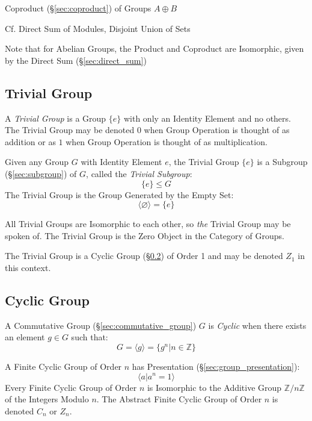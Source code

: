 Coproduct (\S\ref{sec:coproduct}) of Groups $A \oplus B$

\fist Cf. Direct Sum of Modules, Disjoint Union of Sets

\fist Note that for Abelian Groups, the Product and Coproduct
are Isomorphic, given by the Direct Sum (\S\ref{sec:direct_sum})



\subsection{Trivial Group}\label{sec:trivial_group}

A \emph{Trivial Group} is a Group $\{e\}$ with only an Identity Element and no
others. The Trivial Group may be denoted $0$ when Group Operation is thought of
as addition or as $1$ when Group Operation is thought of as multiplication.

Given any Group $G$ with Identity Element $e$, the Trivial Group $\{e\}$ is a
Subgroup (\S\ref{sec:subgroup}) of $G$, called the \emph{Trivial Subgroup}:
\[
    \{e\} \leq G
\]
The Trivial Group is the Group Generated by the Empty Set:
\[
  \langle{\varnothing}\rangle = \{ e \}
\]

All Trivial Groups are Isomorphic to each other, so \emph{the} Trivial Group may
be spoken of. The Trivial Group is the Zero Object in the Category of Groups.

The Trivial Group is a Cyclic Group (\S\ref{sec:cyclic_group}) of Order 1 and
may be denoted $Z_1$ in this context.



\subsection{Cyclic Group}\label{sec:cyclic_group}

A Commutative Group (\S\ref{sec:commutative_group}) $G$ is \emph{Cyclic} when
there exists an element $g \in G$ such that:
\[
    G = \langle{g}\rangle = \{ g^n | n \in \mathbb{Z} \}
\]

A Finite Cyclic Group of Order $n$ has Presentation
(\S\ref{sec:group_presentation}):
\[
  \langle{a | a^n = 1}\rangle
\]
Every Finite Cyclic Group of Order $n$ is Isomorphic to the Additive Group
$\mathbb{Z}/n\mathbb{Z}$ of the Integers Modulo $n$. The Abstract Finite Cyclic
Group of Order $n$ is denoted $C_n$ or $Z_n$.

